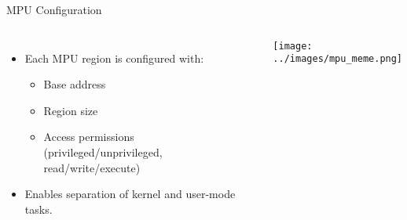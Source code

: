 \begin{frame}{MPU Configuration}
    \begin{columns}
        \begin{itemize}
            \item Each MPU region is configured with:
            \begin{itemize}
                \item Base address
                \item Region size
                \item Access permissions (privileged/unprivileged, read/write/execute)
            \end{itemize}
            \item Enables separation of kernel and user-mode tasks.
        \end{itemize}

        \centering
        \texttt{[image: ../images/mpu\_meme.png]}
    \end{columns}
\end{frame}

